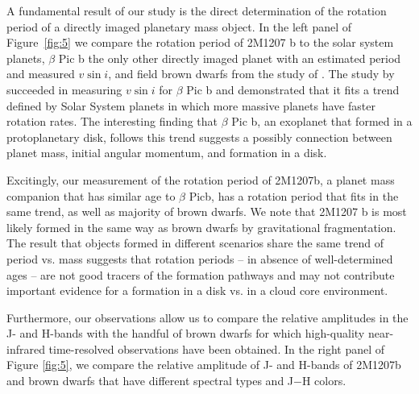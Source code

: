\documentclass[apj]{emulateapj}
\newcommand{\bpic}{$\beta$ Pic}
\newcommand{\vsini}{$v\sin i$}
\begin{document}
A fundamental result of our study is the direct determination of the
rotation period of a directly imaged planetary mass object. In the
left panel of Figure~\ref{fig:5} we compare the rotation period of
2M1207 b to the solar system planets, \bpic{} b the only other directly
imaged planet with an estimated period and measured \vsini, and
field brown dwarfs from the study of \citep[][]{Metchev2015}.  The
study by \citep[][]{Snellen2014} succeeded in measuring \vsini{} 
for \bpic{} b and demonstrated that it fits a trend defined by Solar
System planets in which more massive planets have faster rotation
rates. The interesting finding that \bpic{} b, an exoplanet that formed
in a protoplanetary disk, follows this trend suggests a possibly
connection between planet mass, initial angular momentum, and
formation in a disk.

Excitingly, our measurement of the rotation period of 2M1207b, a
planet mass companion that has similar age to \bpic b, has a rotation
period that fits in the same trend, as well as majority of brown
dwarfs.  We note that 2M1207 b is most likely formed in the same way
as brown dwarfs by gravitational fragmentation. The result that
objects formed in different scenarios share the same trend of period
vs. mass suggests that rotation periods -- in absence of
well-determined ages -- are not good tracers of the formation pathways
and may not contribute important evidence for a formation in a disk
vs. in a cloud core environment.

Furthermore, our observations allow us to compare the relative
amplitudes in the J- and H-bands with the handful of brown dwarfs
for which high-quality near-infrared time-resolved observations have
been obtained. In the right panel of Figure \ref{fig:5}, we compare the
relative amplitude of J- and H-bands of 2M1207b and brown dwarfs
\citep{Apai2013,Buenzli2012,Buenzli2015,Burgasser2013,Radigan2012,Yang2014} that
have different spectral types and J$-$H colors.
\end{document}

